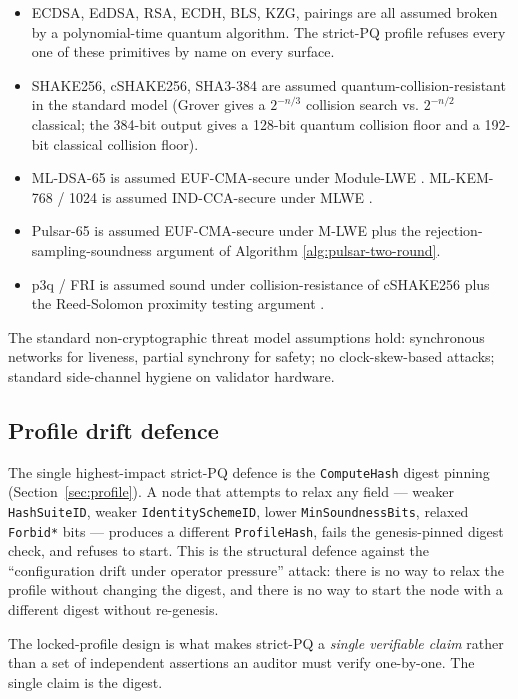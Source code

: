 \begin{itemize}[leftmargin=2em,nosep]
  \item ECDSA, EdDSA, RSA, ECDH, BLS, KZG, pairings are all assumed broken
    by a polynomial-time quantum algorithm. The strict-PQ profile refuses
    every one of these primitives by name on every surface.
  \item SHAKE256, cSHAKE256, SHA3-384 are assumed quantum-collision-resistant
    in the standard model (Grover gives a $2^{-n/3}$ collision search vs.
    $2^{-n/2}$ classical; the 384-bit output gives a 128-bit quantum
    collision floor and a 192-bit classical collision floor).
  \item ML-DSA-65 is assumed EUF-CMA-secure under Module-LWE
    \cite{dilithium,fips204}. ML-KEM-768 / 1024 is assumed IND-CCA-secure
    under MLWE \cite{fips203}.
  \item Pulsar-65 is assumed EUF-CMA-secure under M-LWE plus the
    rejection-sampling-soundness argument of Algorithm
    \ref{alg:pulsar-two-round}.
  \item p3q / FRI is assumed sound under collision-resistance of
    cSHAKE256 plus the Reed-Solomon proximity testing argument
    \cite{fri}.
\end{itemize}

The standard non-cryptographic threat model assumptions hold: synchronous
networks for liveness, partial synchrony for safety; no clock-skew-based
attacks; standard side-channel hygiene on validator hardware.

\subsection{Profile drift defence}

The single highest-impact strict-PQ defence is the
\texttt{ComputeHash} digest pinning (Section~\ref{sec:profile}). A node
that attempts to relax any field --- weaker \texttt{HashSuiteID}, weaker
\texttt{IdentitySchemeID}, lower \texttt{MinSoundnessBits},
relaxed \texttt{Forbid*} bits --- produces a different
\texttt{ProfileHash}, fails the genesis-pinned digest check, and refuses
to start. This is the structural defence against the ``configuration drift
under operator pressure'' attack: there is no way to relax the profile
without changing the digest, and there is no way to start the node with a
different digest without re-genesis.

The locked-profile design is what makes strict-PQ a \emph{single
verifiable claim} rather than a set of independent assertions an auditor
must verify one-by-one. The single claim is the digest.

